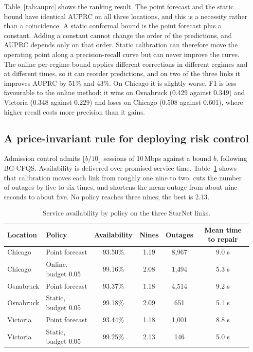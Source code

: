 \documentclass[acmsmall,screen]{acmart}
\begin{document}
Table~\ref{tab:auprc} shows the ranking result. The point forecast and the static bound have identical AUPRC on all three locations, and this is a necessity rather than a coincidence. A static conformal bound is the point forecast plus a constant. Adding a constant cannot change the order of the predictions, and AUPRC depends only on that order. Static calibration can therefore move the operating point along a precision-recall curve but can never improve the curve. The online per-regime bound applies different corrections in different regimes and at different times, so it can reorder predictions, and on two of the three links it improves AUPRC by 51\% and 43\%. On Chicago it is slightly worse. F1 is less favourable to the online method: it wins on Osnabruck (0.429 against 0.349) and Victoria (0.348 against 0.229) and loses on Chicago (0.508 against 0.601), where higher recall costs more precision than it gains.

\subsection{A price-invariant rule for deploying risk control}
\label{sec:cost}

Admission control admits $\lfloor b/10 \rfloor$ sessions of 10\,Mbps against a bound $b$, following BG-CFQS. Availability is delivered over promised service time. Table~\ref{tab:avail} shows that calibration moves each link from roughly one nine to two, cuts the number of outages by five to six times, and shortens the mean outage from about nine seconds to about five. No policy reaches three nines; the best is 2.13.

\begin{table}[t]
\caption{Service availability by policy on the three StarNet links.}
\label{tab:avail}
\begin{tabular}{llcccc}
\toprule
Location & Policy & Availability & Nines & Outages & Mean time to repair \\
\midrule
Chicago & Point forecast & 93.50\% & 1.19 & 8,967 & 9.0 s \\
Chicago & Online, budget 0.05 & 99.16\% & 2.08 & 1,494 & 5.3 s \\
Osnabruck & Point forecast & 93.37\% & 1.18 & 4,514 & 9.2 s \\
Osnabruck & Static, budget 0.05 & 99.18\% & 2.09 & 651 & 5.1 s \\
Victoria & Point forecast & 93.44\% & 1.18 & 1,001 & 8.8 s \\
Victoria & Static, budget 0.05 & 99.25\% & 2.13 & 146 & 5.0 s \\
\bottomrule
\end{tabular}
\end{table}
\end{document}
